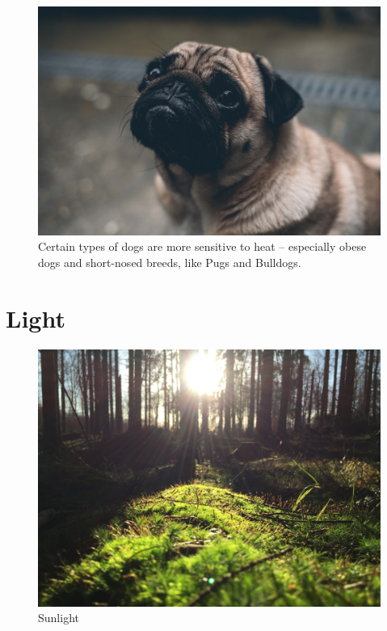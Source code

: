 \documentclass[]{book}
\begin{document}
\begin{figure}

{\centering \includegraphics[width=1\linewidth]{figures/pug} 

}

\caption{Certain types of dogs are more sensitive to heat – especially obese dogs and short-nosed breeds, like Pugs and Bulldogs.}\label{fig:heat-canine}
\end{figure}

\chapter{Light}\label{light}

\begin{figure}

{\centering \includegraphics[width=1\linewidth]{figures/sunlight} 

}

\caption{Sunlight}\label{fig:sunlight}
\end{figure}
\end{document}
